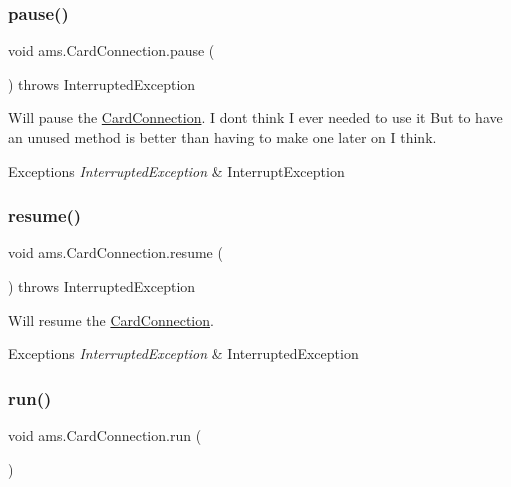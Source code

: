 \subsubsection{\texorpdfstring{pause()}{pause()}}
{\footnotesize\ttfamily void ams.\+Card\+Connection.\+pause (\begin{DoxyParamCaption}{ }\end{DoxyParamCaption}) throws Interrupted\+Exception}

Will pause the \mbox{\hyperlink{classams_1_1_card_connection}{Card\+Connection}}. I don\textquotesingle{}t think I ever needed to use it But to have an unused method is better than having to make one later on I think. 
\begin{DoxyExceptions}{Exceptions}
{\em Interrupted\+Exception} & Interrupt\+Exception \\
\hline
\end{DoxyExceptions}
\mbox{\label{classams_1_1_card_connection_abbba44c123cd6f69c54e7d9ea0e5e291}} 
\subsubsection{\texorpdfstring{resume()}{resume()}}
{\footnotesize\ttfamily void ams.\+Card\+Connection.\+resume (\begin{DoxyParamCaption}{ }\end{DoxyParamCaption}) throws Interrupted\+Exception}

Will resume the \mbox{\hyperlink{classams_1_1_card_connection}{Card\+Connection}}. 
\begin{DoxyExceptions}{Exceptions}
{\em Interrupted\+Exception} & Interrupted\+Exception \\
\hline
\end{DoxyExceptions}
\mbox{\label{classams_1_1_card_connection_a051dbf503815b5296b95ead953c5a137}} 
\subsubsection{\texorpdfstring{run()}{run()}}
{\footnotesize\ttfamily void ams.\+Card\+Connection.\+run (\begin{DoxyParamCaption}{ }\end{DoxyParamCaption})}

